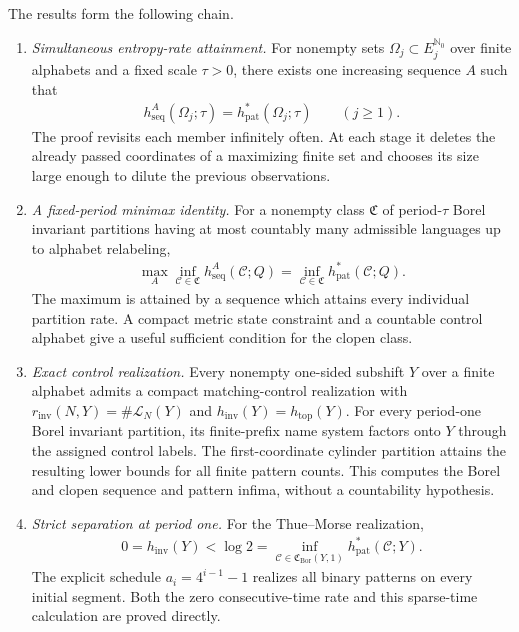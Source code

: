 \documentclass[11pt,reqno]{amsart}
\numberwithin{equation}{section}
\theoremstyle{definition}
\begin{document}
The results form the following chain.
\begin{enumerate}[label=\textup{(\Alph*)}]
\item \emph{Simultaneous entropy-rate attainment.}
For nonempty sets $\Omega_j\subset E_j^{\mathbb N_0}$ over finite
alphabets and a fixed scale $\tau>0$, there exists one increasing sequence
$A$ such that
\begin{align*}
 h_{\mathrm{seq}}^A(\Omega_j;\tau)
 =h_{\mathrm{pat}}^*(\Omega_j;\tau)\qquad(j\ge1).
\end{align*}
The proof revisits each member infinitely often. At each stage it deletes
the already passed coordinates of a maximizing finite set and chooses
its size large enough to dilute the previous observations.

\item \emph{A fixed-period minimax identity.}
For a nonempty class $\mathfrak C$ of period-$\tau$ Borel invariant
partitions having at most countably many admissible languages up to
alphabet relabeling,
\begin{align*}
 \max_A\inf_{\mathcal C\in\mathfrak C}
 h_{\mathrm{seq}}^A(\mathcal C;Q)
 =\inf_{\mathcal C\in\mathfrak C}h_{\mathrm{pat}}^*(\mathcal C;Q).
\end{align*}
The maximum is attained by a sequence which attains every individual
partition rate. A compact metric state constraint and a countable control
alphabet give a useful sufficient condition for the clopen class.

\item \emph{Exact control realization.}
Every nonempty one-sided subshift $Y$ over a finite alphabet admits a
compact matching-control realization with
$r_{\mathrm{inv}}(N,Y)=\#\mathcal L_N(Y)$ and
$h_{\mathrm{inv}}(Y)=h_{\mathrm{top}}(Y)$.
For every period-one Borel invariant partition, its finite-prefix name
system factors onto $Y$ through the assigned control labels. The
first-coordinate cylinder partition attains the resulting lower bounds
for all finite pattern counts. This computes the Borel and clopen
sequence and pattern infima, without a countability hypothesis.

\item \emph{Strict separation at period one.}
For the Thue--Morse realization,
\begin{align*}
 0=h_{\mathrm{inv}}(Y)
 <\log2=\inf_{\mathcal C\in\mathfrak C_{\mathrm{Bor}}(Y,1)}
 h_{\mathrm{pat}}^*(\mathcal C;Y).
\end{align*}
The explicit schedule $a_i=4^{i-1}-1$ realizes all binary patterns on
every initial segment. Both the zero consecutive-time rate and this
sparse-time calculation are proved directly.
\end{enumerate}
\end{document}
